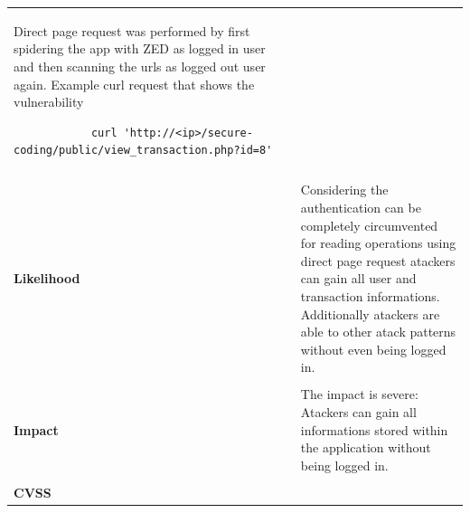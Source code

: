 \begin{longtable*}{p{.20\textwidth} | p{.80\textwidth}}
        Direct page request was performed by first spidering the app with ZED as logged in user and then scanning the urls as logged out user again. \newline
        Example curl request that shows the vulnerability
        \begin{lstlisting}
			curl 'http://<ip>/secure-coding/public/view_transaction.php?id=8'
		\end{lstlisting}
    \\\\
    \textbf{Likelihood} &
        Considering the authentication can be completely circumvented for reading operations using direct page request atackers can gain all user and transaction informations. Additionally atackers are able to other atack patterns without even being logged in.
    \\\\
    \textbf{Impact} &
       The impact is severe: Atackers can gain all informations stored within the application without being logged in.
    \\\\
    \textbf{CVSS} &
        
    \\
    \hline
\end{longtable*}
